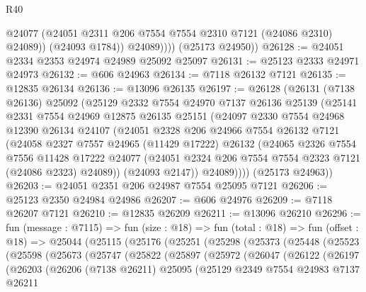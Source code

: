 \begin{lexlean}{R40}
\begin{coremodule}
                  @24077
                  (@24051 @2311 @206 @7554 @7554 @2310 @7121 (@24086 @2310) @24089))
                (@24093 @1784))
              @24089))))
      (@25173 @24950))
@26128 := @24051 @2334 @2353 @24974 @24989 @25092 @25097
@26131 := @25123 @2333 @24971 @24973
@26132 := @606 @24963
@26134 := @7118 @26132 @7121
@26135 := @12835 @26134
@26136 := @13096 @26135
@26197 := @26128
    (@26131
      (@7138 @26136)
      @25092
      (@25129
        @2332
        @7554
        @24970
        @7137
        @26136
        @25139
        (@25141
          @2331
          @7554
          @24969
          @12875
          @26135
          @25151
          (@24097
            @2330
            @7554
            @24968
            @12390
            @26134
            @24107
            (@24051
              @2328
              @206
              @24966
              @7554
              @26132
              @7121
              (@24058
                @2327
                @7557
                @24965
                (@11429 @17222)
                @26132
                (@24065
                  @2326
                  @7554
                  @7556
                  @11428
                  @17222
                  @24077
                  (@24051 @2324 @206 @7554 @7554 @2323 @7121 (@24086 @2323) @24089))
                (@24093 @2147))
              @24089))))
      (@25173 @24963))
@26203 := @24051 @2351 @206 @24987 @7554 @25095 @7121
@26206 := @25123 @2350 @24984 @24986
@26207 := @606 @24976
@26209 := @7118 @26207 @7121
@26210 := @12835 @26209
@26211 := @13096 @26210
@26296 := fun (message : @7115) =>
  fun (size : @18) =>
  fun (total : @18) =>
  fun (offset : @18) =>
  @25044
    (@25115
      (@25176
        (@25251
          (@25298
            (@25373
              (@25448
                (@25523
                  (@25598
                    (@25673
                      (@25747
                        (@25822
                          (@25897
                            (@25972
                              (@26047
                                (@26122
                                  (@26197
                                    (@26203
                                      (@26206
                                        (@7138 @26211)
                                        @25095
                                        (@25129
                                          @2349
                                          @7554
                                          @24983
                                          @7137
                                          @26211

\end{coremodule}
\end{lexlean}
